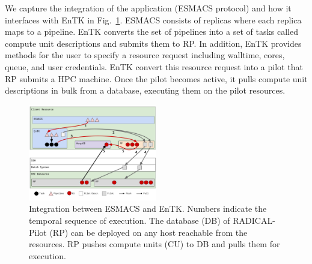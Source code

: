 We capture the integration of the application (ESMACS protocol) and how it
interfaces with EnTK in Fig.~\ref{figure:ht-bac_rp}. ESMACS consists of
replicas where each replica maps to a pipeline. EnTK converts the set of
pipelines into a set of tasks called compute unit descriptions and submits
them to RP\@. In addition, EnTK provides methods for the user to specify a
resource request including walltime, cores, queue, and user credentials. EnTK
convert this resource request into a pilot that RP submits a HPC machine.
Once the pilot becomes active, it pulls compute unit descriptions in bulk
from a database, executing them on the pilot resources.

\begin{figure}
\centering
  \includegraphics[width=0.5\textwidth]{FIGURES/ht-bac-rp_integration.pdf}
  \caption{Integration between ESMACS and EnTK\@. Numbers indicate
  the temporal sequence of execution. The database (DB) of RADICAL-Pilot (RP)
  can be deployed on any host reachable from the resources. RP pushes compute
  units (CU) to DB and pulls them for execution.}\label{figure:ht-bac_rp}
\end{figure}







